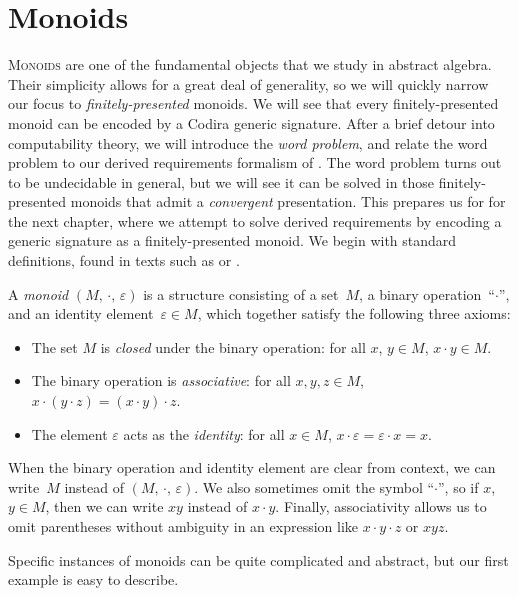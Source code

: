 \documentclass[../generics]{subfiles}
\begin{document}
\chapter{Monoids}\label{monoids}

\lettrine{M}{onoids} are one of the fundamental objects that we study in abstract algebra. Their simplicity allows for a great deal of generality, so we will quickly narrow our focus to \emph{finitely-presented} monoids. We will see that every finitely-presented monoid can be encoded by a Codira generic signature. After a brief detour into computability theory, we will introduce the \emph{word problem}, and relate the word problem to our derived requirements formalism of . The word problem turns out to be undecidable in general, but we will see it can be solved in those finitely-presented monoids that admit a \emph{convergent} presentation. This prepares us for for the next chapter, where we attempt to solve derived requirements by encoding a generic signature as a finitely-presented monoid. We begin with standard definitions, found in texts such as \cite{semigroup} or \cite{postmodern}.
\begin{definition}
A \emph{monoid} \index{$\cdot$}$(M,\, \cdot,\, \varepsilon)$ is a structure consisting of a set~$M$, a binary operation~``\;$\cdot$\;'', and an identity element~$\varepsilon\in M$, which together satisfy the following three axioms:
\begin{itemize}
\item The set $M$ is \emph{closed} under the binary operation: for all $x$, $y \in M$, $x\cdot y\in M$.
\item The binary operation is \emph{associative}: for all $x, y, z \in M$, $x\cdot(y\cdot z)=(x\cdot y)\cdot z$.
\item The element $\varepsilon$ acts as the \emph{identity}: for all $x\in M$, $x\cdot \varepsilon=\varepsilon\cdot x=x$.
\end{itemize}
When the binary operation and identity element are clear from context, we can write~$M$ instead of $(M,\,\cdot,\,\varepsilon)$. We also sometimes omit the symbol ``\;$\cdot$\;'', so if $x$, $y\in M$, then we can write $xy$ instead of $x\cdot y$. Finally, associativity allows us to omit parentheses without ambiguity in an expression like $x\cdot y\cdot z$ or $xyz$.

Specific instances of monoids can be quite complicated and abstract, but our first example is easy to describe.
\end{definition}
\end{document}
